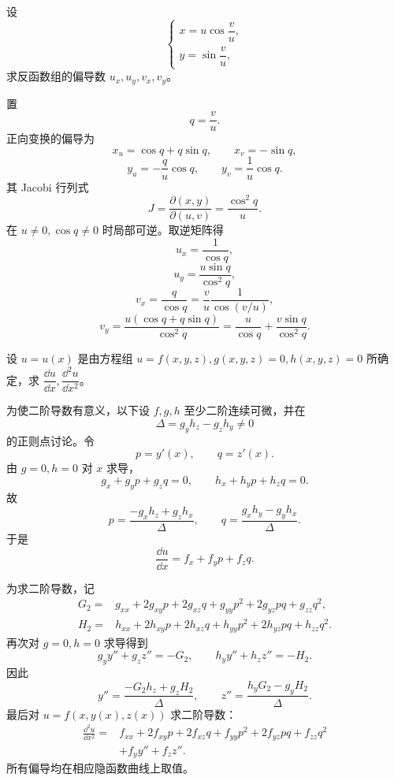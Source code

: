 \begin{xexercise}[4]
设
  \[
    \begin{cases}
      x=u\cos\dfrac vu,\\
      y=\sin\dfrac vu,
    \end{cases}
  \]
  求反函数组的偏导数 $u_x,u_y,v_x,v_y$。
\end{xexercise}
\begin{xsolution}
置
\[
  q=\frac vu.
\]
正向变换的偏导为
\[
  x_u=\cos q+q\sin q,
  \qquad x_v=-\sin q,
\]
\[
  y_u=-\frac q u\cos q,
  \qquad y_v=\frac1u\cos q.
\]
其 Jacobi 行列式
\[
  J=\frac{\partial(x,y)}{\partial(u,v)}
  =\frac{\cos^2q}{u}.
\]
在 $u\ne0,\cos q\ne0$ 时局部可逆。取逆矩阵得
\[
  \boxed{\displaystyle u_x=\frac1{\cos q}},
\]
\[
  \boxed{\displaystyle
    u_y=\frac{u\sin q}{\cos^2q}},
\]
\[
  \boxed{\displaystyle
    v_x=\frac q{\cos q}=\frac vu\frac1{\cos(v/u)}},
\]
\[
  \boxed{\displaystyle
    v_y=\frac{u(\cos q+q\sin q)}{\cos^2q}
       =\frac{u}{\cos q}+\frac{v\sin q}{\cos^2q}}.
\]
\end{xsolution}


\begin{xexercise}[5]
设 $u=u(x)$ 是由方程组 $u=f(x,y,z),g(x,y,z)=0,h(x,y,z)=0$ 所确定，求 $\dfrac{\dd u}{\dd x},\dfrac{\dd^2u}{\dd x^2}$。
\end{xexercise}
\begin{xsolution}
为使二阶导数有意义，以下设 $f,g,h$ 至少二阶连续可微，并在
\[
  \Delta=g_yh_z-g_zh_y\ne0
\]
的正则点讨论。令
\[
  p=y'(x),\qquad q=z'(x).
\]
由 $g=0,h=0$ 对 $x$ 求导，
\[
  g_x+g_yp+g_zq=0,
  \qquad
  h_x+h_yp+h_zq=0.
\]
故
\[
  p=\frac{-g_xh_z+g_zh_x}{\Delta},
  \qquad
  q=\frac{g_xh_y-g_yh_x}{\Delta}.
\]
于是
\[
  \boxed{\displaystyle
    \frac{\dd u}{\dd x}=f_x+f_yp+f_zq}.
\]

为求二阶导数，记
\begin{align*}
  G_2={}&g_{xx}+2g_{xy}p+2g_{xz}q
       +g_{yy}p^2+2g_{yz}pq+g_{zz}q^2,\\
  H_2={}&h_{xx}+2h_{xy}p+2h_{xz}q
       +h_{yy}p^2+2h_{yz}pq+h_{zz}q^2.
\end{align*}
再次对 $g=0,h=0$ 求导得到
\[
  g_y y''+g_z z''=-G_2,
  \qquad
  h_y y''+h_z z''=-H_2.
\]
因此
\[
  y''=\frac{-G_2h_z+g_zH_2}{\Delta},
  \qquad
  z''=\frac{h_yG_2-g_yH_2}{\Delta}.
\]
最后对 $u=f(x,y(x),z(x))$ 求二阶导数：
\[
  \boxed{\begin{aligned}
  \frac{\dd^2u}{\dd x^2}
  ={}&f_{xx}+2f_{xy}p+2f_{xz}q
      +f_{yy}p^2+2f_{yz}pq+f_{zz}q^2\\
     &+f_y y''+f_z z''.
  \end{aligned}}
\]
所有偏导均在相应隐函数曲线上取值。
\end{xsolution}


